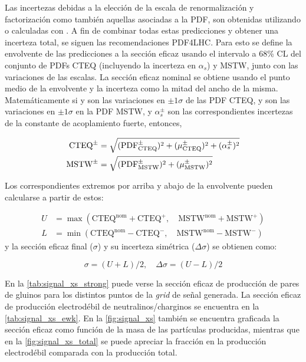 \newcommand{\alphap}{\ensuremath{\alpha_s_+}}
\newcommand{\alpham}{\ensuremath{\alpha_s^-}}
\newcommand{\alphapm}{\ensuremath{\alpha_s^{\pm}}}

Las incertezas debidas a la elección de la escala de renormalización y
factorización como también aquellas asociadas a la PDF, son obtenidas utilizando {\nllfast} o
calculadas con {\prospino}. A fin de combinar todas estas predicciones y obtener
una incerteza total, se siguen las recomendaciones PDF4LHC\cite{Botje:2011sn}.
Para esto se define la envolvente de las predicciones a la sección eficaz usando
el intervalo a 68\% CL del conjunto de PDFs CTEQ (incluyendo la incerteza en
$\alpha_s$) y MSTW, junto con las variaciones de las escalas. La sección eficaz
nominal se obtiene usando el punto medio de la envolvente y la incerteza como la
mitad del ancho de la misma. Matemáticamente si {\pdfcteqpm} y {\scacteqpm} son
las variaciones en $\pm 1\sigma$ de las PDF CTEQ,  {\pdfmstwpm} y {\scamstwpm}
son las variaciones en $\pm 1\sigma$ en la PDF MSTW, y {\alphapm} son las
correspondientes incertezas de la constante de acoplamiento fuerte, entonces,

\begin{align}
  \mathrm{CTEQ}^{\pm} &= \sqrt{(\pdfcteqpm)^2 + (\scacteqpm)^2 + (\alphapm)^2} \\
  \mathrm{MSTW}^{\pm} &= \sqrt{(\pdfmstwpm)^2 + (\scamstwpm)^2}
\end{align}

Los correspondientes extremos por arriba y abajo de la envolvente pueden calcularse a partir de estos:

\begin{align}
  U &= \max(\mathrm{CTEQ}^\mathrm{nom} + \mathrm{CTEQ}^{+},\quad \mathrm{MSTW}^\mathrm{nom} + \mathrm{MSTW}^{+}) \\
  L &= \min(\mathrm{CTEQ}^\mathrm{nom} - \mathrm{CTEQ}^{-},\quad \mathrm{MSTW}^\mathrm{nom} - \mathrm{MSTW}^{-})
\end{align}
%
y la sección eficaz final ($\sigma$) y su incerteza simétrica ($\Delta\sigma$) se obtienen como:

\begin{equation}
  \sigma = (U+L)/2,\quad \Delta\sigma = (U-L)/2
\end{equation}


En la \cref{tab:signal_xs_strong} puede verse la sección eficaz de producción de
pares de gluinos para los distintos puntos de la \emph{grid} de señal generada. La
sección eficaz de producción electrodébil de neutralinos/charginos se encuentra en la
\cref{tab:signal_xs_ewk}. En la \cref{fig:signal_xs} también se encuentra
graficada la sección eficaz como función de la masa de las partículas
producidas, mientras que en la \cref{fig:signal_xs_total} se puede apreciar la
fracción en la producción electrodébil comparada con la producción total.

